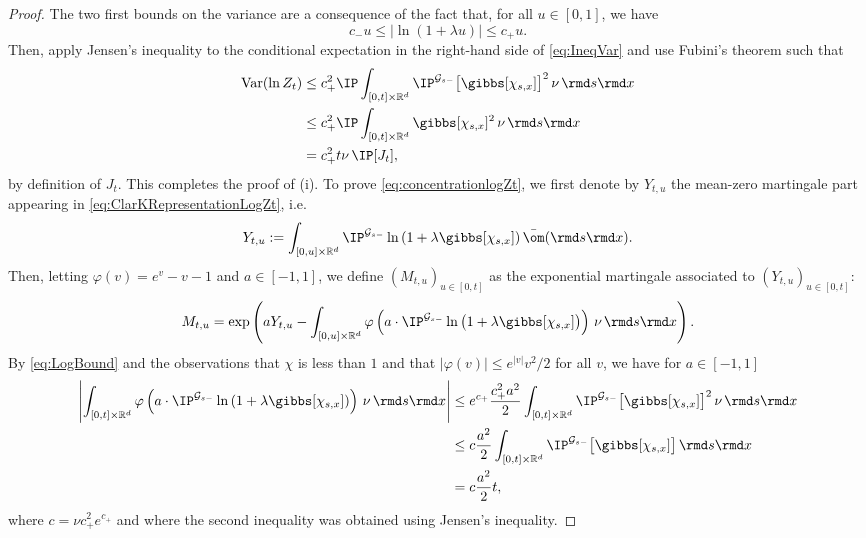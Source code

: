 \begin{proof}
The two first bounds on the variance are a consequence of the fact that, for all $u\in [0,1]$, we have 
\begin{equation}\label{eq:LogBound}
c_- u \leq |\ln(1+\lambda u)| \leq c_+ u.\end{equation} Then, apply Jensen's inequality to the conditional expectation in the right-hand side of \eqref{eq:IneqVar} and use Fubini's theorem such that
\begin{align*}
\mathrm{Var} (\ln Z_t) &\leq c_+^2 \IP \int_{[0,t]\times\mathbb{R}^d} \IP^{\mathcal{G}_{s-}}\big[ \gibbs [\chi_{s,x}] \big]^2 \, \nu \hspace{0.5mm} \rmd s \rmd x \\
&\leq c_+^2 \IP \int_{[0,t]\times\mathbb{R}^d} \gibbs [\chi_{s,x}]^2 \, \nu \hspace{0.5mm} \rmd s \rmd x \\
& = c_+^2 t \nu \, \IP[J_t],
\end{align*}
by definition of $J_t$. This completes the proof of (i).
To prove \eqref{eq:concentrationlogZt}, we first denote by $Y_{t,u}$ the mean-zero martingale part appearing in \eqref{eq:ClarKRepresentationLogZt}, i.e.
\[Y_{t,u} := \int_{[0,u]\times\mathbb{R}^d} \IP^{\mathcal{G}_{s-}}\ln \left(1+\lambda \gibbs[\chi_{s,x}]\right) \bar{\om}(\rmd s \rmd x).\]
Then, letting $\varphi(v)=e^v - v - 1$ and $a\in [-1,1]$, we define $(M_{t,u})_{u\in[0,t]}$ as the exponential martingale associated to $(Y_{t,u})_{u\in[0,t]}$:
\[M_{t,u}=\exp\left(aY_{t,u}-\int_{[0,u]\times \mathbb{R}^d}  \varphi\left(a \cdot\IP^{\mathcal{G}_{s-}}\ln \big(1+\lambda \gibbs[\chi_{s,x}]\big)\right) \, \nu \hspace{0.5mm} \rmd s \rmd x\right).\]
By \eqref{eq:LogBound} and the observations that $\chi$ is less than $1$ and that $|\varphi(v)|\leq e^{|v|} v^2/2$ for all $v$, we have for $a\in[-1,1]$
\begin{align*}\left| \int_{[0,t]\times \mathbb{R}^d}  \varphi\left(a \cdot\IP^{\mathcal{G}_{s-}}\ln \left(1+\lambda \gibbs[\chi_{s,x}]\right)\right) \, \nu \, \rmd s \rmd x \right| 
&\leq e^{c_+} \frac{c_+^2 a^2}{2} \int_{[0,t]\times\mathbb{R}^d} \IP^{\mathcal{G}_{s-}}\big[ \gibbs [\chi_{s,x}] \big]^2 \, \nu \hspace{0.5mm} \rmd s \rmd x\\
&\leq c \frac{a^2}{2} \int_{[0,t]\times\mathbb{R}^d} \IP^{\mathcal{G}_{s-}}\big[ \gibbs [\chi_{s,x}] \big] \, \rmd s \rmd x\\
&= c \frac{a^2}{2}t,
\end{align*}
where $c = \nu c_+^2 e^{c_+}$ and where the second inequality was obtained using Jensen's inequality. 


\end{proof}
